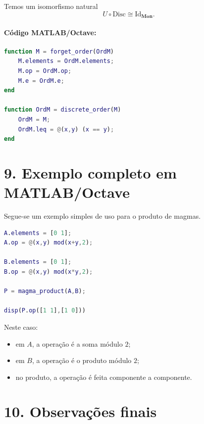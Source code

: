 \documentclass[a4paper,12pt]{article}
\begin{document}
Temos um isomorfismo natural
\[
U\circ \mathrm{Disc}\cong \mathrm{Id}_{\mathbf{Mon}}.
\]

\paragraph{Código MATLAB/Octave:}
\begin{lstlisting}[language=Matlab]
function M = forget_order(OrdM)
    M.elements = OrdM.elements;
    M.op = OrdM.op;
    M.e = OrdM.e;
end

function OrdM = discrete_order(M)
    OrdM = M;
    OrdM.leq = @(x,y) (x == y);
end
\end{lstlisting}

\section*{9. Exemplo completo em MATLAB/Octave}

Segue-se um exemplo simples de uso para o produto de magmas.

\begin{lstlisting}[language=Matlab]
A.elements = [0 1];
A.op = @(x,y) mod(x+y,2);

B.elements = [0 1];
B.op = @(x,y) mod(x*y,2);

P = magma_product(A,B);

disp(P.op([1 1],[1 0]))
\end{lstlisting}

Neste caso:
\begin{itemize}
    \item em $A$, a operação é a soma módulo $2$;
    \item em $B$, a operação é o produto módulo $2$;
    \item no produto, a operação é feita componente a componente.
\end{itemize}

\section*{10. Observações finais}
\end{document}
